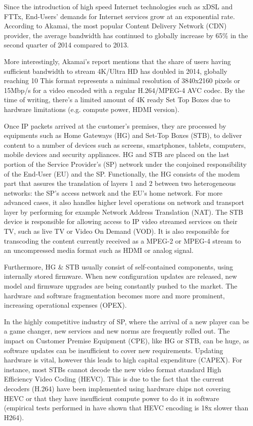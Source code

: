 Since the introduction of high speed Internet technologies such as xDSL and FTTx, End-Users' demands for Internet services grow at an exponential rate.
According to Akamai, the most popular Content Delivery Network (CDN) provider, the average bandwidth has continued to globally increase by 65\% in the second quarter of 2014 \cite{_akamais_2014} compared to 2013.

More interestingly, Akamai's report mentions that the share of users having sufficient bandwidth to stream 4K/Ultra HD has doubled in 2014, globally reaching 10%
This format represents a minimal resolution of 3840x2160 pixels or 15Mbp/s for a video encoded with a regular H.264/MPEG-4 AVC codec.
By the time of writing, there's a limited amount of 4K ready Set Top Boxes due to hardware limitations (e.g. compute power, HDMI version).

Once IP packets arrived at the customer's premises, they are processed by equipments such as Home Gateways (HG) and Set-Top Boxes (STB), to deliver content to a number of devices such as screens, smartphones, tablets, computers, mobile devices and security appliances.
HG and STB are placed on the last portion of the Service Provider's (SP) network under the conjoined responsibility of the End-User (EU) and the SP.
Functionally, the HG consists of the modem part that assures the translation of layers 1 and 2 between two heterogeneous networks: the SP's access network and the EU's home network.
For more advanced cases, it also handles higher level operations on network and transport layer by performing for example Network Address Translation (NAT).
The STB device is responsible for allowing access to IP video streamed services on their TV, such as live TV or Video On Demand (VOD).
It is also responsible for transcoding the content currently received as a MPEG-2 or MPEG-4 stream to an uncompressed media format such as HDMI or analog signal.

Furthermore, HG \& STB usually consist of self-contained components, using internally stored firmware.
When new configuration updates are released, new model and firmware upgrades are being constantly pushed to the market.
The hardware and software fragmentation becomes more and more prominent, increasing operational expenses (OPEX). 

In the highly competitive industry of SP, where the arrival of a new player can be a game changer, new services and new norms are frequently rolled out.
The impact on Customer Premise Equipment (CPE), like HG or STB, can be huge, as software updates can be insufficient to cover new requirements.
Updating hardware is vital, however this leads to high capital expenditure (CAPEX).
For instance, most STBs cannot decode the new video format standard  High Efficiency Video Coding (HEVC).
This is due to the fact that the current decoders (H.264) have been implemented using hardware chips not covering HEVC or that they have insufficient compute power to do it in software (empirical tests performed in \cite{grois_performance_2013} have shown that HEVC encoding is 18x slower than H264).

